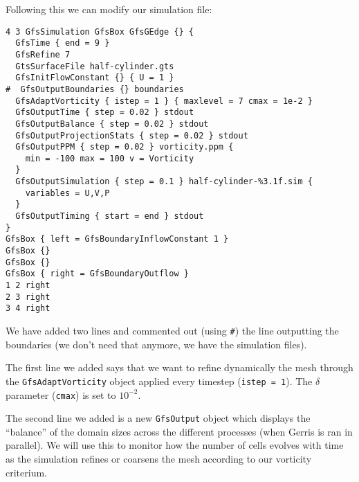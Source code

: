 \documentclass[a4paper]{article}
\begin{document}
Following this we can modify our simulation file:
\begin{verbatim}
4 3 GfsSimulation GfsBox GfsGEdge {} {
  GfsTime { end = 9 }
  GfsRefine 7
  GtsSurfaceFile half-cylinder.gts
  GfsInitFlowConstant {} { U = 1 }
#  GfsOutputBoundaries {} boundaries
  GfsAdaptVorticity { istep = 1 } { maxlevel = 7 cmax = 1e-2 }
  GfsOutputTime { step = 0.02 } stdout
  GfsOutputBalance { step = 0.02 } stdout
  GfsOutputProjectionStats { step = 0.02 } stdout
  GfsOutputPPM { step = 0.02 } vorticity.ppm {
    min = -100 max = 100 v = Vorticity
  }
  GfsOutputSimulation { step = 0.1 } half-cylinder-%3.1f.sim {
    variables = U,V,P
  }
  GfsOutputTiming { start = end } stdout
}
GfsBox { left = GfsBoundaryInflowConstant 1 }
GfsBox {}
GfsBox {}
GfsBox { right = GfsBoundaryOutflow }
1 2 right
2 3 right
3 4 right
\end{verbatim}
We have added two lines and commented out (using {\tt \#}) the line
outputting the boundaries (we don't need that anymore, we have the
simulation files).

The first line we added says that we want to refine dynamically the
mesh through the {\tt GfsAdaptVorticity} object applied every timestep
({\tt istep = 1}). The $\delta$ parameter ({\tt cmax}) is set to $10^{-2}$.

The second line we added is a new {\tt GfsOutput} object which displays 
the ``balance'' of the domain sizes across the different processes
(when Gerris is ran in parallel). We will use this to monitor how the
number of cells evolves with time as the simulation refines or
coarsens the mesh according to our vorticity criterium.
\end{document}
